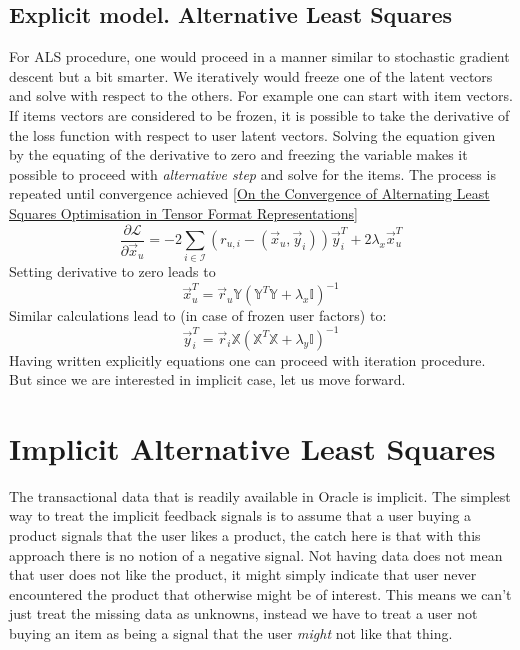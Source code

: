 \documentclass[12pt]{article}
\begin{document}
\subsection{Explicit model. Alternative Least Squares}\label{eals}
For ALS procedure, one would proceed in a manner similar to stochastic gradient descent but a bit smarter. We iteratively would freeze one of the latent vectors and solve with respect to the others. For example one can start with item vectors. If items vectors are considered to be frozen, it is possible to  take the derivative of the loss function with respect to user latent vectors. Solving the equation given by the equating of the derivative to zero and freezing the variable makes it possible to proceed with {\it{alternative step}} and solve for the items. The process is repeated until convergence achieved \ref{On the Convergence of Alternating Least Squares Optimisation in Tensor Format Representations}
\begin{equation}
\frac{\partial \mathcal{L}}{\partial \vec{x}_u}  = -2 \sum_{i \in \mathcal{I}} \left(r_{u,i}-(\vec{x}_u, \vec{y}_i)\right) \vec{y}_i^T+
2\lambda_x \vec{x}_u^{T}
\end{equation}
Setting derivative to zero leads to 
\begin{equation}
\vec{x}_u^T  = \vec{r}_u\mathbb{Y}\left(\mathbb{Y}^T\mathbb{Y}+\lambda_x\mathbb{I}\right)^{-1}
\end{equation}
Similar calculations lead to (in case of frozen user factors) to:
\begin{equation}
\vec{y}_i^T  = \vec{r}_i\mathbb{X}\left(\mathbb{X}^T\mathbb{X}+\lambda_y\mathbb{I}\right)^{-1}
\end{equation}
Having written explicitly equations one can proceed with iteration procedure. But since we are interested in implicit case, let us move forward.

\section{Implicit Alternative Least Squares}\label{ials}
The transactional data that is readily available in Oracle is implicit. The simplest way to treat the implicit feedback signals is to assume that a user  buying a product signals that the user likes a product, the catch here is that with this approach there is no notion of a negative signal. Not having data does not mean that user does not like the product, it might simply indicate that user never encountered the product that otherwise might be of interest. This means we can't just treat the missing data as unknowns, instead we have to treat a user not buying an item as being a signal that the user {\it might} not like that thing.
\end{document}
